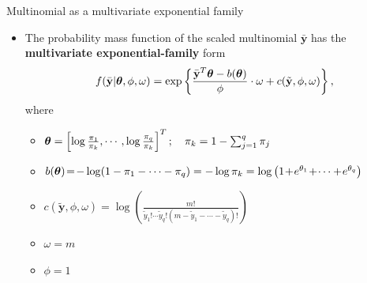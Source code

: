 \documentclass{beamer}
\begin{document}
\begin{frame} {Multinomial as a multivariate exponential family}
\begin{itemize}
\item
The  probability mass function of the scaled multinomial $\bar{\textbf{y}}$ has the {\bf multivariate exponential-family} form
\[
f(\bar{\textbf{y}} | \mbox{\boldmath $\theta$}, \phi, \omega)=\exp\left\{\frac{\bar{\textbf{y}}^T
 \mbox{\boldmath $\theta$} -b(\mbox{\boldmath $\theta$})}{\phi}\cdot \omega + 
c(\tilde{\textbf{y}},\phi, \omega)\right\}, 
\]
where
\begin{itemize}
\item $\mbox{\boldmath $\theta$}=\left[\log\frac{\pi_1}{\pi_{k}}, \cdots, \log\frac{\pi_{q}}{\pi_{k}}\right]^T;
\quad \pi_{k}=1-\sum_{j=1}^q\pi_{j}$
\item $b(\mbox{\boldmath $\theta$})\!=\!-\log(1-\pi_{1}-\cdots -\pi_{q})=-\log\pi_{k}
=\log\left(1\!+\!e^{\theta_{1}}\!+\!\cdots+\!e^{\theta_{q}}\right)$
\item $c(\tilde{\textbf{y}},\phi,\omega)=\log\left(\frac{m!}{\tilde{y}_{1}!\cdots \tilde{y}_{q}!(m-\tilde{y}_1-\cdots-\tilde{y}_q)!}\right)$
\item  $\omega=m$
\item $\phi = 1$
\end{itemize}



\end{itemize}
\end{frame}
\end{document}
